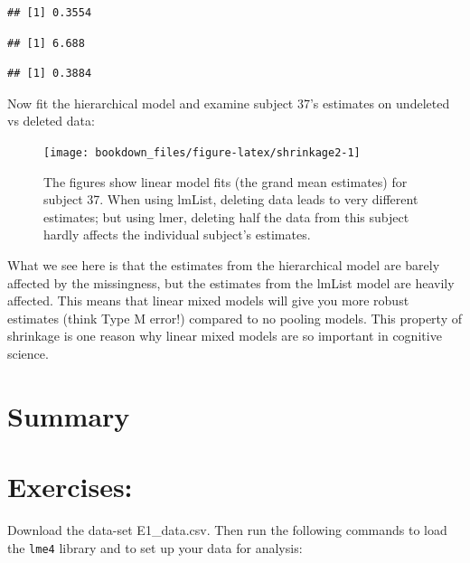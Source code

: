 \documentclass[12pt,]{krantz}
\newenvironment{Shaded}{\begin{snugshade}}{\end{snugshade}}
\newcommand{\CommentTok}[1]{\textcolor[rgb]{0.56,0.35,0.01}{\textit{#1}}}
\newcommand{\DataTypeTok}[1]{\textcolor[rgb]{0.13,0.29,0.53}{#1}}
\newcommand{\DecValTok}[1]{\textcolor[rgb]{0.00,0.00,0.81}{#1}}
\newcommand{\KeywordTok}[1]{\textcolor[rgb]{0.13,0.29,0.53}{\textbf{#1}}}
\newcommand{\NormalTok}[1]{#1}
\newcommand{\OperatorTok}[1]{\textcolor[rgb]{0.81,0.36,0.00}{\textbf{#1}}}
\newcommand{\OtherTok}[1]{\textcolor[rgb]{0.56,0.35,0.01}{#1}}
\newcommand{\StringTok}[1]{\textcolor[rgb]{0.31,0.60,0.02}{#1}}
\begin{document}
\begin{verbatim}
## [1] 0.3554
\end{verbatim}

\begin{verbatim}
## [1] 6.688
\end{verbatim}

\begin{verbatim}
## [1] 0.3884
\end{verbatim}

Now fit the hierarchical model and examine subject 37's estimates on undeleted vs deleted data:

\begin{figure}
\texttt{[image: bookdown\_files/figure-latex/shrinkage2-1]} \caption{The figures show linear model fits (the grand mean estimates) for subject 37. When using lmList, deleting data leads to very different estimates; but using lmer, deleting half the data from this subject hardly affects the individual subject's estimates.}\label{fig:shrinkage2}
\end{figure}

What we see here is that the estimates from the hierarchical model are barely affected by the missingness, but the estimates from the lmList model are heavily affected.
This means that linear mixed models will give you more robust estimates (think Type M error!) compared to no pooling models. This property of shrinkage is one reason why linear mixed models are so important in cognitive science.

\hypertarget{summary}{%
\section{Summary}\label{summary}}

\hypertarget{sec:LMExercises}{%
\section{Exercises:}\label{sec:LMExercises}}

Download the data-set E1\_data.csv. Then run the following commands to load the \texttt{lme4} library and to set up your data for analysis:

\begin{Shaded}
\end{Shaded}
\end{document}
